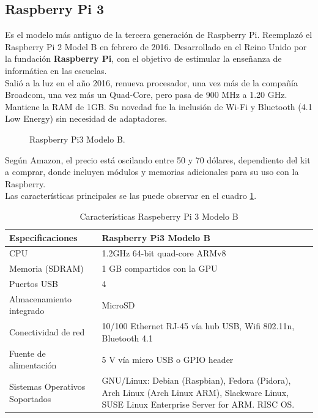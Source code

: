 \documentclass[conference]{IEEEtran}
\begin{document}
\subsection{Raspberry Pi 3}
Es el modelo más antiguo de la tercera generación de Raspberry Pi. Reemplazó el Raspberry Pi 2 Model B en febrero de 2016. Desarrollado en el Reino Unido por la fundación \textbf{Raspberry Pi}, con el objetivo de estimular la enseñanza de informática en las escuelas. \\
Salió a la luz en el año 2016, renueva procesador, una vez más de la compañía Broadcom, una vez más un Quad-Core, pero pasa de 900 MHz a 1.20 GHz. Mantiene la RAM de 1GB. Su novedad fue la inclusión de Wi-Fi y Bluetooth (4.1 Low Energy) sin necesidad de adaptadores.
\begin{figure}[h]
	\caption{Raspberry Pi3 Modelo B.}
	\label{fig:ant01}
\end{figure}
Según Amazon, el precio está oscilando entre 50 y 70 dólares, dependiento del kit a comprar, donde incluyen módulos y memorias adicionales para su uso con la Raspberry.\\
Las características principales se las puede observar en el cuadro \ref{tab:rb01}.
\begin{table}[tbp]
\begin{center}
	\begin{tabular}{|p{2.5cm}|p{5.5cm}|}
	\hline 
	\textbf{Especificaciones} &\textbf{Raspberry Pi3 Modelo B} \\ \hline
	CPU  &1.2GHz 64-bit quad-core ARMv8 \\\hline
	Memoria (SDRAM) &1 GB compartidos con la GPU \\\hline
	Puertos USB &4 \\\hline
	Almacenamiento integrado &MicroSD \\\hline
	Conectividad de red &10/100 Ethernet RJ-45 vía hub USB, Wifi 802.11n, Bluetooth 4.1 \\\hline
	Fuente de alimentación &5 V vía micro USB o GPIO header \\\hline
	Sistemas Operativos Soportados &GNU/Linux: Debian (Raspbian), Fedora (Pidora), Arch Linux (Arch Linux ARM), Slackware Linux, SUSE Linux Enterprise Server for ARM. RISC OS.\\\hline
\end{tabular}\vspace{0.25cm}
\caption{Características Raspeberry Pi 3 Modelo B}
\label{tab:rb01}
\end{center}
\end{table}
\end{document}
